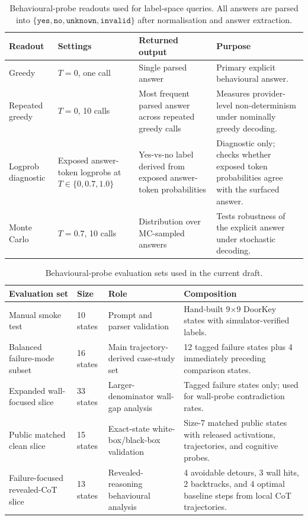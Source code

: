 \documentclass[final]{sparreport}
\begin{document}
\begin{table}[h]
\centering
\small
\begin{tabular}{p{3.0cm} p{2.1cm} p{3.7cm} p{5.0cm}}
\toprule
Readout & Settings & Returned output & Purpose \\
\midrule
Greedy & $T=0$, one call & Single parsed answer & Primary explicit behavioural answer. \\
Repeated greedy & $T=0$, 10 calls & Most frequent parsed answer across repeated greedy calls & Measures provider-level non-determinism under nominally greedy decoding. \\
Logprob diagnostic & Exposed answer-token logprobs at $T \in \{0, 0.7, 1.0\}$ & Yes-vs-no label derived from exposed answer-token probabilities & Diagnostic only; checks whether exposed token probabilities agree with the surfaced answer. \\
Monte Carlo & $T=0.7$, 10 calls & Distribution over MC-sampled answers & Tests robustness of the explicit answer under stochastic decoding. \\
\bottomrule
\end{tabular}
\caption{Behavioural-probe readouts used for label-space queries. All answers are parsed into
$\{\texttt{yes}, \texttt{no}, \texttt{unknown}, \texttt{invalid}\}$ after normalisation and
answer extraction.}
\label{tab:bp-readouts}
\end{table}

\begin{table}[h]
\centering
\small
\begin{tabular}{p{3.3cm} p{1.4cm} p{4.3cm} p{5.0cm}}
\toprule
Evaluation set & Size & Role & Composition \\
\midrule
Manual smoke test & 10 states & Prompt and parser validation & Hand-built 9$\times$9 DoorKey states with simulator-verified labels. \\
Balanced failure-mode subset & 16 states & Main trajectory-derived case-study set & 12 tagged failure states plus 4 immediately preceding comparison states. \\
Expanded wall-focused slice & 33 states & Larger-denominator wall-gap analysis & Tagged failure states only; used for wall-probe contradiction rates. \\
Public matched clean slice & 15 states & Exact-state white-box/black-box validation & Size-7 matched public states with released activations, trajectories, and cognitive probes. \\
Failure-focused revealed-CoT slice & 13 states & Revealed-reasoning behavioural analysis & 4 avoidable detours, 3 wall hits, 2 backtracks, and 4 optimal baseline steps from local CoT trajectories. \\
\bottomrule
\end{tabular}
\caption{Behavioural-probe evaluation sets used in the current draft.}
\label{tab:bp-datasets}
\end{table}
\end{document}
